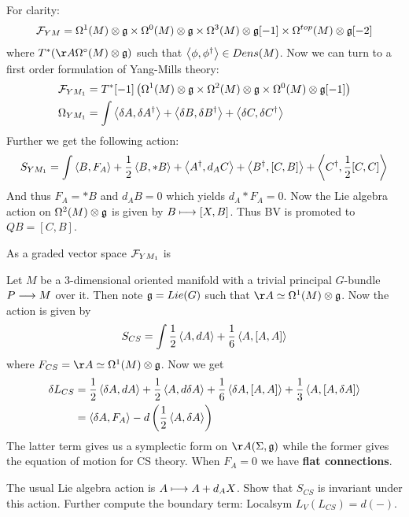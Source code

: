 \begin{example}
  For clarity:
  \begin{align}
    {\mathcal{F}}_{YM} = \Omega^1(M) \otimes \mathfrak{g} \times \Omega^0(M) \otimes \mathfrak{g} \times \Omega^3(M) \otimes \mathfrak{g}[-1] \times \Omega^{top}(M) \otimes \mathfrak{g}[-2]
  \end{align}
  where $T^*(\AA \Omega^\circ (M) \otimes \gf)$ such that $\pair{\phi}{\phi^\dagger} \in Dens(M)$. Now we can turn to a first order formulation of Yang-Mills theory:
  \begin{align}
    {\mathcal{F}}_{YM_1} &= T^*[-1]\left( \Omega^1(M) \otimes \mathfrak{g} \times \Omega^2(M) \otimes \mathfrak{g} \times \Omega^0(M) \otimes \mathfrak{g}[-1] \right) \\
    \Omega_{YM_1} &= \int \left\langle \delta A , \delta A^\dagger \right\rangle + \left\langle \delta B , \delta B^\dagger \right\rangle + \left\langle \delta C , \delta C^\dagger \right\rangle
  \end{align}
  Further we get the following action:
  \begin{equation}
    S_{YM_1} = \int \left\langle B , F_A \right\rangle + \frac{1}{2} \left\langle B , *B \right\rangle + \left\langle A^\dagger , d_A C \right\rangle + \left\langle B^\dagger , [C,B] \right\rangle + \left\langle C^\dagger , \frac{1}{2}[C,C] \right\rangle
  \end{equation}
  And thus $F_A = *B$ and $d_A B = 0$ which yields $d_A *F_A = 0$. Now the Lie algebra action on $\Omega^2 (M) \otimes \mathfrak{g}$ is given by $B \longmapsto [X,B]$. Thus BV is promoted to $QB = [C,B]$.

  \begin{rem}
    As a graded vector space ${\mathcal{F}}_{YM_1}$ is
  \end{rem}
\end{example}


\begin{example}
  Let $M$ be a $3$-dimensional oriented manifold with a trivial principal $G$-bundle $P \longrightarrow M$ over it. Then note $\mathfrak{g} = Lie(G)$ such that $\AA \simeq \Omega^1(M) \otimes \gf$. Now the action is given by
  \begin{equation}
    S_{CS} = \int \frac{1}{2} \left\langle A , dA \right\rangle + \frac{1}{6} \left\langle A , [A,A] \right\rangle
  \end{equation}
  where $F_{CS} = \AA \simeq \Omega^1(M) \otimes \gf$. Now we get
  \begin{align}
    \delta L_{CS} &= \frac{1}{2} \left\langle \delta A , dA \right\rangle + \frac{1}{2} \left\langle A , d \delta A \right\rangle + \frac{1}{6} \left\langle \delta A , [A,A] \right\rangle + \frac{1}{3} \left\langle A , [A,\delta A] \right\rangle \\
    &= \left\langle \delta A , F_A \right\rangle - d \left( \frac{1}{2} \left\langle A , \delta A \right\rangle \right)
  \end{align}
  The latter term gives us a symplectic form on $\AA(\Sigma, \gf)$ while the former gives the equation of motion for CS theory. When $F_A = 0$ we have \textbf{flat connections}.

  \begin{ex}
    The usual Lie algebra action is $A \longmapsto A + d_A X$. Show that $S_{CS}$ is invariant under this action. Further compute the boundary term: Localsym $L_V (L_{CS}) = d(-)$.
  \end{ex}
\end{example}



~\\
